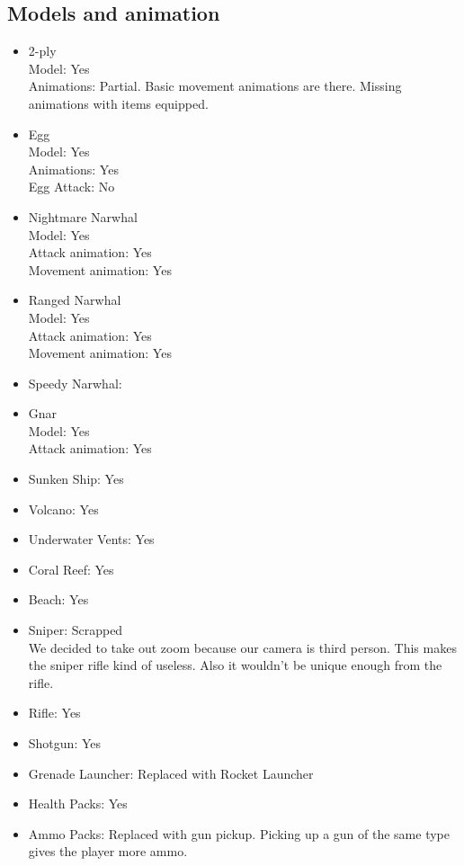 \documentclass{article}
\begin{document}
\subsection{Models and animation}
\begin{itemize}
\item 2-ply\\
	Model: Yes\\
    Animations: Partial. Basic movement animations are there. Missing animations with items equipped.

\item Egg\\
	Model: Yes\\
    Animations: Yes\\
    Egg Attack: No

\item Nightmare Narwhal\\
	Model: Yes\\
    Attack animation: Yes\\
    Movement animation: Yes
    
\item Ranged Narwhal\\
	Model: Yes\\
    Attack animation: Yes\\
    Movement animation: Yes
    
\item Speedy Narwhal:
	
\item Gnar\\
	Model: Yes\\
    Attack animation: Yes
    
\item Sunken Ship: Yes

\item Volcano: Yes

\item Underwater Vents: Yes

\item Coral Reef: Yes

\item Beach: Yes

\item Sniper: Scrapped\\
	We decided to take out zoom because our camera is third person. This makes the sniper rifle kind of useless. Also it wouldn't be unique enough from the rifle.

\item Rifle: Yes

\item Shotgun: Yes

\item Grenade Launcher: Replaced with Rocket Launcher

\item Health Packs: Yes

\item Ammo Packs: Replaced with gun pickup. Picking up a gun of the same type gives the player more ammo.
\end{itemize}
\end{document}
